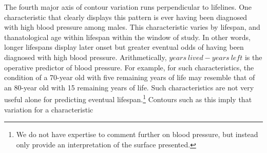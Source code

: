 \documentclass[11pt,oneside,a4paper]{article}
\begin{document}
The fourth major axis of contour variation runs perpendicular to lifelines. One
characteristic that clearly displays this pattern is ever having been
diagnosed with high blood pressure among males. This characteristic varies by
lifespan, and thanatological age within lifespan within the window of study.
In other words, longer lifespans display later onset but greater eventual odds of
having been diagnosed with high blood pressure. Arithmetically, $years~lived - years~left$ is the
operative predictor of blood pressure. For example, for
such characteristics, the condition of a 70-year old with five
remaining years of life may resemble that of an 80-year old with
15 remaining years of life. Such characteristics are not very useful alone for
predicting eventual lifespan.\footnote{We do not have expertise to comment further on blood pressure, but instead only provide an interpretation of the surface presented.} Contours such as this imply that variation for a characteristic
\end{document}

